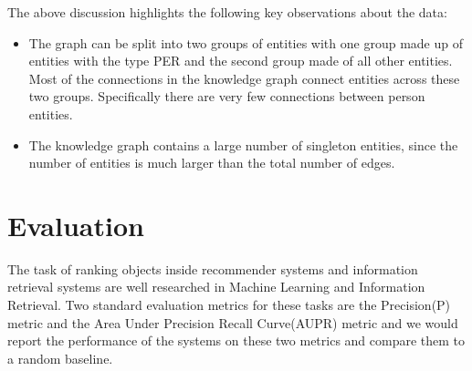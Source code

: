 \documentclass[paper=a4,fontsize=11pt]{scrartcl}
\makeatletter
\newcommand{\exref}[1]{example~\ref{#1}}
\newcommand{\Todo}[1]{\todo[author=PR,size=\small,inline]{Todo: #1}}
\numberwithin{equation}{section}    %
\numberwithin{figure}{section}      %
\numberwithin{table}{section}       %
\newcommand{\dataset}[0]{\texttt{BBN2} KBP dataset.}
\newcommand{\PK}{P\@K}
\makeatother
\begin{document}
The above discussion highlights the following key observations about the data:
\begin{snugshade}
  \begin{itemize}
  \item The graph can be split into two groups of entities with one group made up of entities with the type
    \textsc{PER} and the second group made of all other entities. Most of the connections in the knowledge graph
    connect entities across these two groups. Specifically there are very few connections between person entities.
  \item The knowledge graph contains a large number of singleton entities, since the number of entities
    is much larger than the total number of edges.
  \end{itemize}
\end{snugshade}


\section{Evaluation}
\label{sec:evaluation}
The task of ranking objects inside recommender systems and information retrieval systems
are well researched in Machine Learning and Information Retrieval.
Two standard evaluation metrics
for these tasks are the {Precision\@K}(\PK) metric and the
{Area Under Precision Recall Curve}(AUPR) metric and
we would report the performance of the systems
on these two metrics and compare them to a random baseline.
\end{document}
